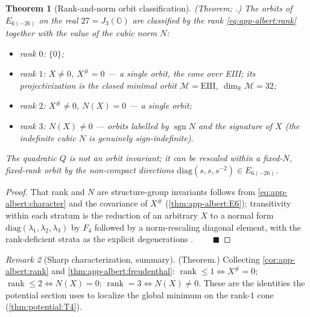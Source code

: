 \documentclass[11pt]{article}
\theoremstyle{plain}
\newtheorem{theorem}{Theorem}[section]
\theoremstyle{definition}
\theoremstyle{remark}
\newtheorem{remark}[theorem]{Remark}
\begin{document}
\begin{theorem}[Rank-and-norm orbit classification]\label{thm:app-albert:orbits}
\textup{(Theorem; \cite{Springer:2000,Krutelevich:2007}.)}
The orbits of $E_{6(-26)}$ on the real $27=J_3(\mathbb O)$ are classified by the
rank \eqref{eq:app-albert:rank} together with the value of the cubic norm $N$:
\begin{itemize}
  \item rank $0$: $\{0\}$;
  \item rank $1$: $X\neq0$, $X^\#=0$ --- a single orbit, the cone over EIII; its
    projectivization is the closed minimal orbit $\mathcal M=\mathrm{EIII}$,
    $\dim_{\mathbb R}\mathcal M=32$;
  \item rank $2$: $X^\#\neq0$, $N(X)=0$ --- a single orbit;
  \item rank $3$: $N(X)\neq0$ --- orbits labelled by $\operatorname{sgn}N$ and the
    signature of $X$ (the indefinite cubic $N$ is genuinely sign-indefinite).
\end{itemize}
The quadratic $Q$ is \emph{not} an orbit invariant; it can be rescaled within a
fixed-$N$, fixed-rank orbit by the non-compact directions
$\mathrm{diag}(s,s,s^{-2})\in E_{6(-26)}$.
\end{theorem}

\begin{proof}
That rank and $N$ are structure-group invariants follows from
\eqref{eq:app-albert:character} and the covariance of $X^\#$
(\autoref{thm:app-albert:E6}); transitivity within each stratum is the
reduction of an arbitrary $X$ to a normal form
$\mathrm{diag}(\lambda_1,\lambda_2,\lambda_3)$ by $F_4$ followed by a
norm-rescaling diagonal element, with the rank-deficient strata as the explicit
degenerations \cite{Krutelevich:2007,Springer:2000}. $\qquad\blacksquare$
\end{proof}

\begin{remark}[Sharp characterization, summary]\label{rmk:app-albert:sharpsummary}
\textup{(Theorem.)}
Collecting \autoref{cor:app-albert:rank} and
\autoref{thm:app-albert:freudenthal}: $\operatorname{rank}\le1\Leftrightarrow
X^\#=0$; $\operatorname{rank}\le2\Leftrightarrow N(X)=0$;
$\operatorname{rank}=3\Leftrightarrow N(X)\neq0$. These are the identities the
potential section uses to localize the global minimum on the rank-$1$ cone
(\autoref{thm:potential:T4}).
\end{remark}

\end{document}
